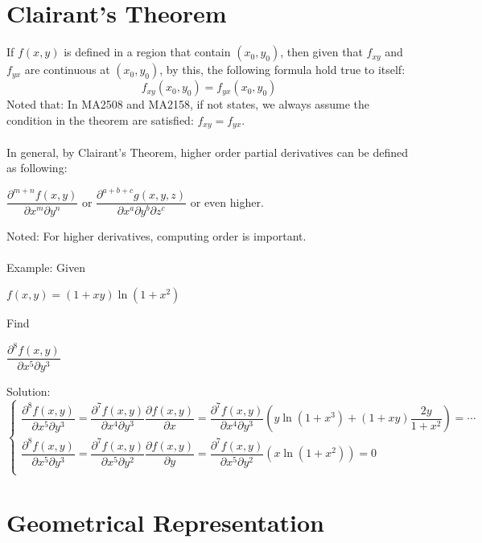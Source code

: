 \documentclass[UTF8,a4paper, 10pt, openany]{book}
\begin{document}
\section{Clairant's Theorem}
If $f(x,y)$ is defined in a region that contain $(x_0,y_0)$, then given that $f_{xy}$ and $f_{yx}$ are continuous at $(x_0,y_0)$, by this, the following formula hold true to itself:
\begin{equation}
\boxed{f_{xy}(x_0,y_0)=f_{yx}(x_0,y_0)}
\end{equation}
Noted that: In MA2508 and MA2158, if not states, we always assume the condition in the theorem are satisfied: $f_{xy}=f_{yx}$.\\ \\
In general, by Clairant's Theorem, higher order partial derivatives can be defined as following:
\begin{center}
$\dfrac{\partial^{m+n}f(x,y)}{\partial x^m \partial y^n}$ or $\dfrac{\partial^{a+b+c}g(x,y,z)}{\partial x^a \partial y^b \partial z^c}$ or even higher.
\end{center}
Noted: For higher derivatives, computing order is important.\\ \\
Example: Given
\begin{center}
$f(x,y)=(1+xy)\ln (1+x^2)$
\end{center}
Find
\begin{center}
$\dfrac{\partial^{8}f(x,y)}{\partial x^5 \partial y^3}$
\end{center}
Solution:
\[
  \begin{cases}
    \dfrac{\partial^{8}f(x,y)}{\partial x^5 \partial y^3}=\dfrac{\partial^{7}f(x,y)}{\partial x^4 \partial y^3}\dfrac{\partial f(x,y)}{\partial x}=\dfrac{\partial^{7}f(x,y)}{\partial x^4 \partial y^3}(y\ln (1+x^3)+(1+xy)\dfrac{2y}{1+x^2})=\cdots \\
    \dfrac{\partial^{8}f(x,y)}{\partial x^5 \partial y^3}=\dfrac{\partial^{7}f(x,y)}{\partial x^5 \partial y^2}\dfrac{\partial f(x,y)}{\partial y}=\dfrac{\partial^{7}f(x,y)}{\partial x^5 \partial y^2}(x\ln (1+x^2))=0 \\
  \end{cases}\]

\section{Geometrical Representation}
\end{document}
